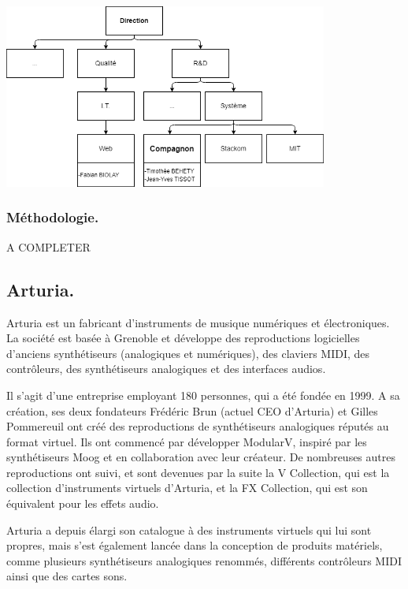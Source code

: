 \documentclass[francais]{rapportPFE}  %
\begin{document}
\begin{center}
	\centering
	\includegraphics[width=0.8\textwidth]{graphics/organigramme.png}
	\begin{tiny}
	\end{tiny}
	\label{fig}
\end{center}

\subsubsection{Méthodologie.}
A COMPLETER



\subsection{Arturia.}

Arturia est un fabricant d'instruments de musique numériques et électroniques. La société est basée à Grenoble et développe des reproductions logicielles d'anciens synthétiseurs (analogiques et numériques), des claviers MIDI, des contrôleurs, des synthétiseurs analogiques et des interfaces audios. 

Il s'agit d'une entreprise employant 180 personnes, qui a été fondée en 1999. A sa création, ses deux fondateurs Frédéric Brun (actuel CEO d'Arturia) et Gilles Pommereuil ont créé des reproductions de synthétiseurs analogiques réputés au format virtuel. Ils ont commencé par développer ModularV, inspiré par les synthétiseurs Moog et en collaboration avec leur créateur. De nombreuses autres reproductions ont suivi, et sont devenues par la suite la V Collection, qui est la collection d'instruments virtuels d'Arturia, et la FX Collection, qui est son équivalent pour les effets audio.

Arturia a depuis élargi son catalogue à des instruments virtuels qui lui sont propres, mais s'est également lancée dans la conception de produits matériels, comme plusieurs synthétiseurs analogiques renommés, différents contrôleurs MIDI ainsi que des cartes sons. 
\end{document}
